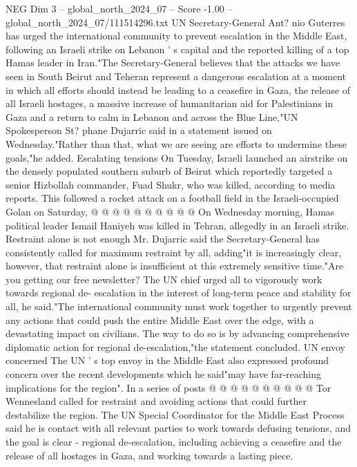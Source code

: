 \begin{textsample}{NEG Dim 3 – global\_north\_2024\_07 – Score -1.00 – global\_north\_2024\_07/111514296.txt}  \label{ex:f3_neg_371}
UN Secretary-General Ant? nio Guterres has urged the international community to prevent escalation in the Middle East, following an Israeli strike on Lebanon ' s capital and the reported killing of a top Hamas leader in Iran."The Secretary-General believes that the attacks we have seen in South Beirut and Teheran represent a dangerous escalation at a moment in which all efforts should instead be leading to a ceasefire in Gaza, the release of all Israeli hostages, a massive increase of humanitarian aid for Palestinians in Gaza and a return to calm in Lebanon and across the Blue Line,"UN Spokesperson St? phane Dujarric said in a statement issued on Wednesday."Rather than that, what we are seeing are efforts to undermine these goals,"he added.
Escalating tensions On Tuesday, Israeli launched an airstrike on the densely populated southern suburb of Beirut which reportedly targeted a senior Hizbollah commander, Fuad Shukr, who was killed, according to media reports.
This followed a rocket attack on a football field in the Israeli-occupied Golan on Saturday, @ @ @ @ @ @ @ @ @ @ On Wednesday morning, Hamas political leader Ismail Haniyeh was killed in Tehran, allegedly in an Israeli strike.
Restraint alone is not enough Mr.
Dujarric said the Secretary-General has consistently called for maximum restraint by all, adding"it is increasingly clear, however, that restraint alone is insufficient at this extremely sensitive time."Are you getting our free newsletter?
The UN chief urged all to vigorously work towards regional de- escalation in the interest of long-term peace and stability for all, he said."The international community must work together to urgently prevent any actions that could push the entire Middle East over the edge, with a devastating impact on civilians.
The way to do so is by advancing comprehensive diplomatic action for regional de-escalation,"the statement concluded.
UN envoy concerned The UN ' s top envoy in the Middle East also expressed profound concern over the recent developments which he said"may have far-reaching implications for the region".
In a series of posts @ @ @ @ @ @ @ @ @ @ Tor Wennesland called for restraint and avoiding actions that could further destabilize the region.
The UN Special Coordinator for the Middle East Process said he is contact with all relevant parties to work towards defusing tensions, and the goal is clear - regional de-escalation, including achieving a ceasefire and the release of all hostages in Gaza, and working towards a lasting piece.

\end{textsample}
